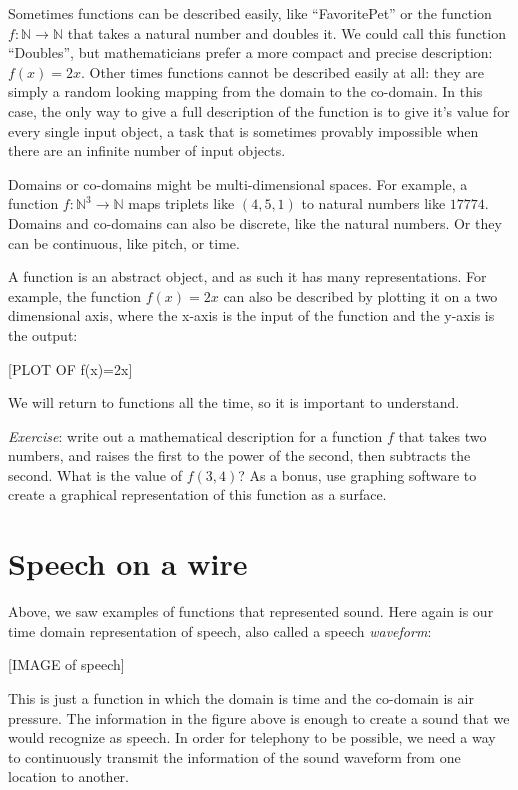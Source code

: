 \documentclass[UTF8]{book}
\begin{document}
\begin{CJK}{UTF8}{gbsn}
Sometimes functions can be described easily, like ``FavoritePet'' or the function $f: \mathbb{N} \rightarrow \mathbb{N}$ that takes a natural number and doubles it. We could call this function ``Doubles'', but mathematicians prefer a more compact and precise description: $f(x) = 2x$. Other times functions cannot be described easily at all: they are simply a random looking mapping from the domain to the co-domain. In this case, the only way to give a full description of the function is to give it's value for every single input object, a task that is sometimes provably impossible when there are an infinite number of input objects.

Domains or co-domains might be multi-dimensional spaces. For example, a function $f: \mathbb{N}^{3} \rightarrow \mathbb{N}$ maps triplets like $(4,5,1)$ to natural numbers like $17774$. Domains and co-domains can also be discrete, like the natural numbers. Or they can be continuous, like pitch, or time.

A function is an abstract object, and as such it has many representations. For example, the function $f(x)=2x$ can also be described by plotting it on a two dimensional axis, where the x-axis is the input of the function and the y-axis is the output:

[PLOT OF f(x)=2x]

We will return to functions all the time, so it is important to understand.

\emph{Exercise}: write out a mathematical description for a function $f$ that takes two numbers, and raises the first to the power of the second, then subtracts the second. What is the value of $f(3,4)$? As a bonus, use graphing software to create a graphical representation of this function as a surface.

\section{Speech on a wire}

Above, we saw examples of functions that represented sound. Here again is our time domain representation of speech, also called a speech \emph{waveform}:

[IMAGE of speech]

This is just a function in which the domain is time and the co-domain is air pressure. The information in the figure above is enough to create a sound that we would recognize as speech. In order for telephony to be possible, we need a way to continuously transmit the information of the sound waveform from one location to another.


\end{CJK}
\end{document}
